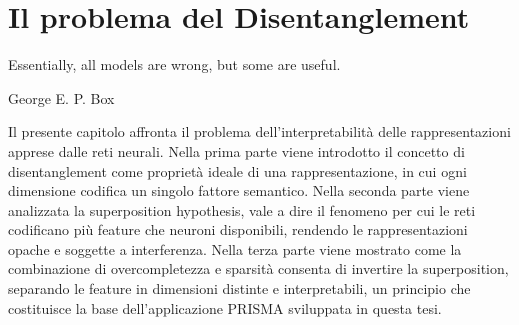 \section{Il problema del Disentanglement}
\label{sec:04_disentanglement}

\epigraph{
    Essentially, all models are wrong, but some are useful.
}{George E. P. Box}
Il presente capitolo affronta il problema dell'interpretabilità delle rappresentazioni apprese dalle reti neurali. Nella prima parte viene introdotto il concetto di disentanglement come proprietà ideale di una rappresentazione, in cui ogni dimensione codifica un singolo fattore semantico. Nella seconda parte viene analizzata la superposition hypothesis, vale a dire il fenomeno per cui le reti codificano più feature che neuroni disponibili, rendendo le rappresentazioni opache e soggette a interferenza. Nella terza parte viene mostrato come la combinazione di overcompletezza e sparsità consenta di invertire la superposition, separando le feature in dimensioni distinte e interpretabili, un principio che costituisce la base dell'applicazione PRISMA sviluppata in questa tesi.
\newpage
